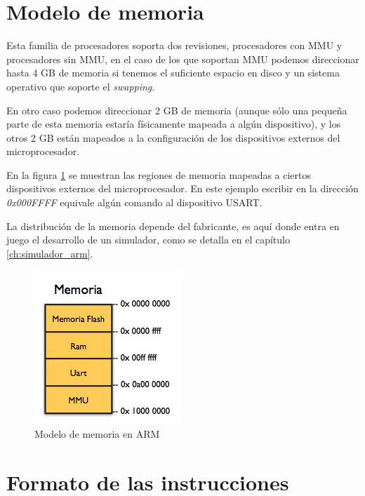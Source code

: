 \section{Modelo de memoria}

Esta familia de procesadores soporta dos revisiones, procesadores
con MMU y procesadores sin MMU, en el caso de los que soportan MMU
podemos direccionar hasta 4 GB de memoria si tenemos el suficiente
espacio en disco y un sistema operativo que soporte el \emph{swapping}.

En otro caso podemos direccionar 2 GB de memoria (aunque sólo una
pequeña parte de esta memoria estaría físicamente mapeada a algún
dispositivo), y los otros 2 GB están mapeados a la configuración de
los dispositivos externos del microprocesador.

En la figura \ref{Flo:memoria} se muestran las regiones de memoria
mapeadas a ciertos dispositivos externos del microprocesador. En este
ejemplo escribir en la dirección \emph{0x000FFFF} equivale algún comando
al dispositivo USART.

La distribución de la memoria depende del fabricante, es aquí donde
entra en juego el desarrollo de un simulador, como se detalla en el
capítulo \ref{ch:simulador_arm}.

%
\begin{figure}[!h]
\centering{}\includegraphics[scale=0.5]{img/memoria}\caption{Modelo de memoria en ARM}
\label{Flo:memoria}
\end{figure}



\section{Formato de las instrucciones}

